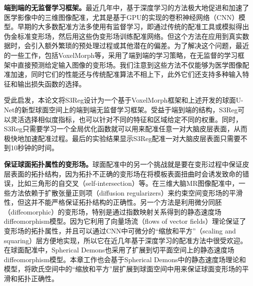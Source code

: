 \textbf{端到端的无监督学习框架。}最近几年中，基于深度学习的方法极大地促进和加速了医学影像中的三维图像配准，尤其是基于GPU的实现的卷积神经网络（CNN）模型\cite{dalca2018unsupervised,balakrishnan2018unsupervised,niethammer2019metric}。早期的大多数配准方法\cite{krebs2017robust,rohe2017svf}多使用有监督学习，即通过传统的配准工具或模拟得出伪金标准变形场，然后用这些伪变形场训练配准网络。但这个方法在应用到真实数据时，会引入额外繁琐的预处理过程或其他潜在的偏差。为了解决这个问题，最近的一些工作\cite{dalca2018unsupervised,balakrishnan2018unsupervised,niethammer2019metric,de2019deep,zhou2020unsupervised}，包括VoxelMorph\cite{balakrishnan2018unsupervised}等，采用了端到端的学习策略，在无监督的学习框架中直接预测给定输入图像的变形场。我们注意到这些方法不仅能够为医学图像配准加速，同时它们的性能还与传统配准算法不相上下，此外它们还支持多种输入特征和输出损失函数的选择。

受此启发，本论文将S3Reg设计为一个基于VoxelMorph框架\cite{balakrishnan2018unsupervised}和上述开发的球面U-Net的新型球面空间上的端到端无监督学习框架。受益于端到端的结构，S3Reg可以灵活选择相似度指标，也可以针对不同的特征和区域给定不同的权重。同时，S3Reg只需要学习一个全局优化函数就可以用来配准任意一对大脑皮层表面，从而极快地加速配准过程。最后的实验结果显示S3Reg配准一对大脑皮层表面只需要不到10秒钟的时间。

\textbf{保证球面拓扑属性的变形场。}\label{sec:保证球面拓扑属性的变形场}球面配准中的另一个挑战就是要在变形过程中保证皮层表面的拓扑结构，因为拓扑不正确的变形场在将模板表面扭曲时会诱发致命的错误，比如三角形的自交叉（self-intersection）等。在三维大脑MR图像配准中，一些方法\cite{balakrishnan2018unsupervised,zhou2020unsupervised}依赖于扩散张量正则项（diffusion regularizers）来约束空间变形场的平滑性，但这并不能严格保证拓扑结构的正确性。另一个方法是利用微分同胚（diffeomorphic）的变形场\cite{beg2005computing}，特别是通过指数映射关系得到的静态速度场diffeomorphism模型\cite{arsigny2006log}。因为它利用了向量场流（flows of vector fields）理论保证了变形场的拓扑属性，并且可以通过CNN中可微分的“缩放和平方”（scaling and squaring）层方便地实现\cite{dalca2018unsupervised,krebs2019learning}，所以它在近几年基于深度学习的配准方法中很受欢迎。在球面配准中，Spherical Demons\cite{yeo2009spherical}也采用了扩展到切平面空间上的静态速度场diffeomorphism模型\cite{olver2000applications}。本章工作也会基于Spherical Demons中的静态速度场理论和模型，将欧氏空间中的“缩放和平方”层扩展到球面空间中用来保证球面变形场的平滑和拓扑正确性。


